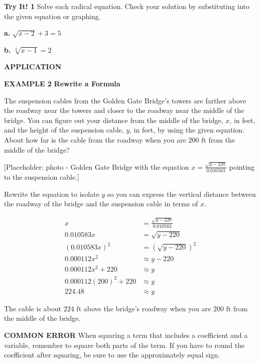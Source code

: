 \documentclass{article}
\newenvironment{concept-box}{}{}
\newenvironment{example}[1]{\textbf{EXAMPLE #1}\quad}{}
\newenvironment{tryit}[1]{\textbf{Try It! #1}\quad}{}
\newcommand{\answer}[1]{}
\newcommand{\placeholder}[2]{[Placeholder: #1 - #2]}
\newcommand{\te}[1]{}
\begin{document}
\begin{tryit}{1}
Solve each radical equation. Check your solution by substituting into the given equation or graphing.

\textbf{a.} $\sqrt{x - 2} + 3 = 5$ \quad \answer{$x = 6$}

\textbf{b.} $\sqrt[3]{x - 1} = 2$ \quad \answer{$x = 9$}
\end{tryit}

\clearpage
\textbf{APPLICATION}

\begin{example}{2}
\textbf{Rewrite a Formula}

The suspension cables from the Golden Gate Bridge's towers are farther above the roadway near the towers and closer to the roadway near the middle of the bridge. You can figure out your distance from the middle of the bridge, $x$, in feet, and the height of the suspension cable, $y$, in feet, by using the given equation. About how far is the cable from the roadway when you are $200\text{ ft}$ from the middle of the bridge?

\placeholder{photo}{Golden Gate Bridge with the equation $x = \frac{\sqrt{y - 220}}{0.010583}$ pointing to the suspension cable.}

Rewrite the equation to isolate $y$ so you can express the vertical distance between the roadway of the bridge and the suspension cable in terms of $x$.

\begin{align*}
x &= \frac{\sqrt{y - 220}}{0.010583} \\
0.010583x &= \sqrt{y - 220} \\
(0.010583x)^2 &= (\sqrt{y - 220})^2 \\
0.000112x^2 &\approx y - 220 \\
0.000112x^2 + 220 &\approx y \quad \text{\te{This equation gives the vertical distance between the deck and the suspension cable for different values of $x$.}} \\
0.000112(200)^2 + 220 &\approx y \\
224.48 &\approx y
\end{align*}

The cable is about $224\text{ ft}$ above the bridge's roadway when you are $200\text{ ft}$ from the middle of the bridge.
\end{example}

\begin{concept-box}
\textbf{COMMON ERROR}
When squaring a term that includes a coefficient and a variable, remember to square both parts of the term. If you have to round the coefficient after squaring, be sure to use the approximately equal sign.
\end{concept-box}
\end{document}
